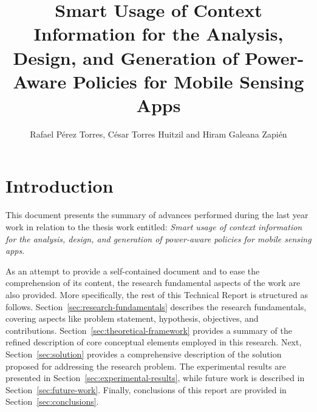 \documentclass[ENG,PhD]{cinvestav}
\title{Smart Usage of Context Information for the Analysis, Design, and Generation of Power-Aware Policies for Mobile Sensing Apps}
\author{Rafael Pérez Torres, César Torres Huitzil and Hiram Galeana Zapién}
\begin{document}
\makeintropages

\renewcommand{\baselinestretch}{1.2}

%                                                                                              
\section{Introduction}
This document presents the summary of advances performed during the last year work in relation to the thesis work entitled: \emph{Smart usage of context information for the analysis, design, and generation of power-aware policies for mobile sensing apps}.

As an attempt to provide a self-contained document and to ease the comprehension of its content, the research fundamental aspects of the work are also provided.
More specifically, the rest of this Technical Report is structured as follows.
Section~\ref{sec:research-fundamentals} describes the research fundamentals, covering aspects like problem statement, hypothesis, objectives, and contributions.
Section~\ref{sec:theoretical-framework} provides a summary of the refined description of core conceptual elements employed in this research.
Next, Section~\ref{sec:solution} provides a comprehensive description of the solution proposed for addressing the research problem.
The experimental results are presented in Section~\ref{sec:experimental-results}, while future work is described in Section~\ref{sec:future-work}.
Finally, conclusions of this report are provided in Section~\ref{sec:conclusions}.
\end{document}
